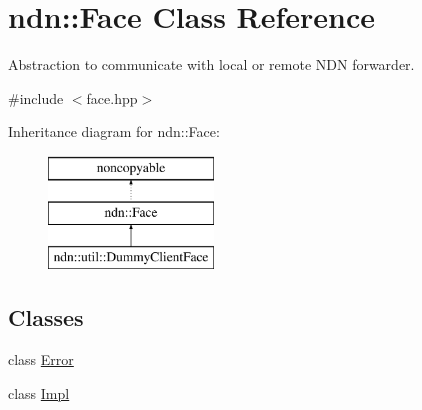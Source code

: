 \hypertarget{classndn_1_1Face}{}\section{ndn\+:\+:Face Class Reference}
\label{classndn_1_1Face}


Abstraction to communicate with local or remote N\+DN forwarder.  




{\ttfamily \#include $<$face.\+hpp$>$}

Inheritance diagram for ndn\+:\+:Face\+:\begin{figure}[H]
\begin{center}
\leavevmode
\includegraphics[height=3.000000cm]{classndn_1_1Face}
\end{center}
\end{figure}
\subsection*{Classes}
\begin{DoxyCompactItemize}
\item 
class \hyperlink{classndn_1_1Face_1_1Error}{Error}
\item 
class \hyperlink{classndn_1_1Face_1_1Impl}{Impl}
\end{DoxyCompactItemize}

